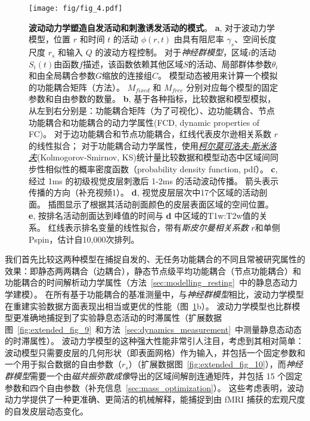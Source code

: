 \documentclass[lang=cn,a4paper,newtx,citestyle=gb7714-2015, bibstyle=gb7714-2015]{elegantpaper}
\begin{document}
\begin{figure}[!htb]
	\centering
	\texttt{[image: fig/fig\_4.pdf]}
	\caption{\textbf{波动动力学塑造自发活动和刺激诱发活动的模式}。
	\textbf{a}, 对于波动力学模型，位置 $ r $ 和时间 $ t $ 的活动 $ \phi(r,t) $ 由具有阻尼率 $ \gamma_s $、空间长度尺度 $ r_s $ 和输入 $ Q $ 的波动方程控制。
	对于\textit{神经群模型}，区域$ i $的活动$ S_i(t) $由函数$ f $描述，该函数依赖其他区域$ S $的活动、局部群体参数$ \theta_i $和由全局耦合参数$ G $缩放的连接组$ C $。
	模型动态被用来计算一个模拟的功能耦合矩阵（方法）。
	$ M_{fixed} $ 和 $ M_{free} $ 分别对应每个模型的固定参数和自由参数的数量。
	\textbf{b}, 基于各种指标，比较数据和模型模拟，从左到右分别是：功能耦合矩阵（为了可视化）、边功能耦合、节点功能耦合和功能耦合的动力学属性(FCD, dynamic properties of FC)。
	对于边功能耦合和节点功能耦合，红线代表皮尔逊相关系数 $ r $ 的线性拟合；
	对于功能耦合动力学属性，使用\textit{\href{https://www.cnblogs.com/jiangkejie/p/11572205.html}{柯尔莫可洛夫-斯米洛夫}}(Kolmogorov-Smirnov, KS)统计量比较数据和模型动态中区域间同步性相似性的概率密度函数（probability density function, pdf）。
	\textbf{c}, 经过 1ms 的初级视觉皮层刺激后 1-2ms 的活动波动传播。
	箭头表示传播的方向（补充视频1）。
	\textbf{d}, 视觉皮层层次中17个区域的活动剖面。
	插图显示了根据其活动剖面颜色的皮层表面区域的空间位置。
	\textbf{e}, 按排名活动剖面达到峰值的时间与 \textbf{d} 中区域的T1w:T2w值的关系。
	红线表示排名变量的线性拟合，带有\textit{斯皮尔曼相关系数} $ r $和单侧Pspin，估计自10,000次排列。
	} \label{fig:4}
\end{figure}


我们首先比较这两种模型在捕捉自发的、无任务功能耦合的不同且常被研究属性的效果：即静态两两耦合（边耦合），静态节点级平均功能耦合（节点功能耦合）和功能耦合的时间解析动力学属性（方法~\ref{sec:modelling_resting}~中的静息态动力学建模）。
在所有基于功能耦合的基准测量中，与\textit{神经群模型}相比，波动力学模型在重建实验数据方面表现出相当或更优的性能（图~\ref{fig:4}b）。
波动力学模型也比群模型更准确地捕捉到了实验静息态活动的时滞属性\cite{raut2021global,bolt2022parsimonious,mitra2015lag}（扩展数据图~\ref{fig:extended_fig_9}~和方法~\ref{sec:dynamics_measurement}~中测量静息态动态的时滞属性）。
波动力学模型的这种强大性能非常引人注目，考虑到其相对简单：波动模型只需要皮层的几何形状（即表面网格）作为输入，并包括一个固定参数和一个用于拟合数据的自由参数（$ r_s $）（扩展数据图~\ref{fig:extended_fig_10}），而\textit{神经群模型}需要一个由\textit{磁共振弥散成像}导出的区域间解剖连通矩阵，并包括 15 个固定参数和四个自由参数（补充信息~\ref{sec:mass_optimization}）。
这些考虑表明，波动动力学提供了一种更准确、更简洁的机械解释，能捕捉到由 fMRI 捕获的宏观尺度的自发皮层动态变化。
\end{document}

